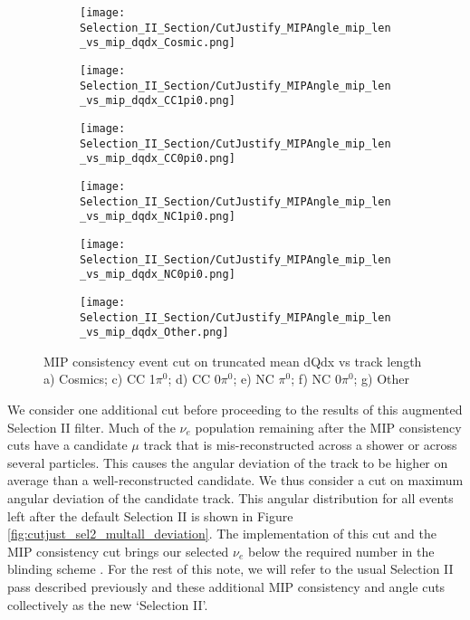 \begin{figure}[t!]
\centering
  \begin{subfigure}[t]{0.35\textwidth}
    \centering
\texttt{[image: Selection\_II\_Section/CutJustify\_MIPAngle\_mip\_len\_vs\_mip\_dqdx\_Cosmic.png]}
    \caption{ }
  \end{subfigure} 
  \hspace{3mm}
  \begin{subfigure}[t]{0.35\textwidth}
    \centering
\texttt{[image: Selection\_II\_Section/CutJustify\_MIPAngle\_mip\_len\_vs\_mip\_dqdx\_CC1pi0.png]}
    \caption{ }
  \end{subfigure} 
  \hspace{3mm}
  \begin{subfigure}[t]{0.35\textwidth}
    \centering
\texttt{[image: Selection\_II\_Section/CutJustify\_MIPAngle\_mip\_len\_vs\_mip\_dqdx\_CC0pi0.png]}
    \caption{ }
  \end{subfigure} 
    \hspace{3mm}
  \begin{subfigure}[t]{0.35\textwidth}
    \centering
\texttt{[image: Selection\_II\_Section/CutJustify\_MIPAngle\_mip\_len\_vs\_mip\_dqdx\_NC1pi0.png]}
    \caption{ }
  \end{subfigure} 
  \hspace{3mm}
  \begin{subfigure}[t]{0.35\textwidth}
    \centering
\texttt{[image: Selection\_II\_Section/CutJustify\_MIPAngle\_mip\_len\_vs\_mip\_dqdx\_NC0pi0.png]}
    \caption{ }
  \end{subfigure}
    \hspace{3mm}
  \begin{subfigure}[t]{0.35\textwidth}
    \centering
\texttt{[image: Selection\_II\_Section/CutJustify\_MIPAngle\_mip\_len\_vs\_mip\_dqdx\_Other.png]}
    \caption{ }
  \end{subfigure} 
\caption{ MIP consistency event cut on truncated mean dQdx vs track length a) Cosmics; c) CC 1$\pi^0$; d) CC 0$\pi^0$; e) NC $\pi^0$; f) NC 0$\pi^0$; g) Other }
\label{fig:cutjust_mip_2d}
\end{figure}

We consider one additional cut before proceeding to the results of this augmented Selection II filter.  Much of the $\nu_e$ population remaining after the MIP consistency cuts have a candidate $\mu$ track that is mis-reconstructed across a shower or across several particles.  This causes the angular deviation of the track to be higher on average than a well-reconstructed candidate.  We thus consider a cut on maximum angular deviation of the candidate track.  This angular distribution for all events left after the default Selection II is shown in Figure \ref{fig:cutjust_sel2_multall_deviation}.  The implementation of this cut and the MIP consistency cut brings our selected $\nu_e$ below the required number in the blinding scheme \cite{bib:jz_unblinding_note}.  For the rest of this note, we will refer to the usual Selection II pass described previously and these additional MIP consistency and angle cuts collectively as the new `Selection II'.

